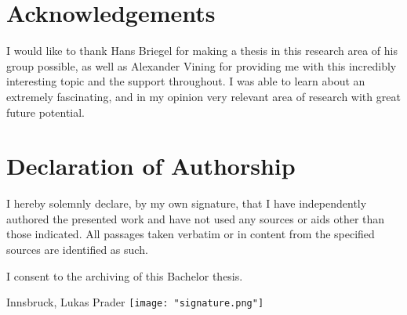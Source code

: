 \documentclass[12pt,a4paper]{article}
\begin{document}
\section{Acknowledgements} \label{sec:acknowledgements}
I would like to thank Hans Briegel for making a thesis in this research area of his group possible, as well as Alexander Vining for providing me with this incredibly interesting topic and the support throughout.
I was able to learn about an extremely fascinating, and in my opinion very relevant area of research with great future potential.

\clearpage
\section*{Declaration of Authorship}

I hereby solemnly declare, by my own signature, that I have independently authored the presented work and have not used any sources or aids other than those indicated. All passages taken verbatim or in content from the specified sources are identified as such.

I consent to the archiving of this Bachelor thesis.

\hfill
\vspace{2cm} Innsbruck, \findate \hfill Lukas Prader \texttt{[image: "signature.png"]}


\newpage
\printbibliography[]

\end{document}
